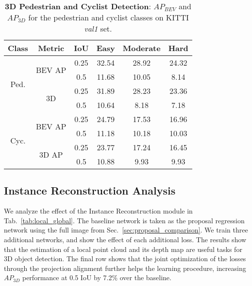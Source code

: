 \documentclass[10pt,twocolumn,letterpaper]{article}
\begin{document}
	\begin{table}[t!]
		\small
		\centering
		\begin{tabular}{|c|c|c||ccc|}
			\hline
			Class & Metric & IoU & Easy & Moderate & Hard\\
			\hline
			\multirow{4}{*}{Ped.} & \multirow{2}{*}{BEV AP} & 0.25 & 32.54 & 28.92 & 24.32 \\
			& & 0.5   & 11.68 & 10.05 & 8.14 \\ \cline{2-6}
			& \multirow{2}{*}{3D}     & 0.25 & 31.89 & 28.23 & 23.36 \\ 
			& & 0.5   & 10.64 & 8.18 & 7.18 \\ \hline
			\multirow{4}{*}{Cyc.} & \multirow{2}{*}{BEV AP} & 0.25 & 24.79 & 17.53 & 16.96 \\
			& & 0.5   & 11.18 & 10.18 & 10.03 \\ \cline{2-6}
			& \multirow{2}{*}{3D AP}  & 0.25 & 23.77 & 17.24 & 16.45 \\
			& & 0.5   & 10.88 & 9.93 & 9.93 \\ \hline 
			
		\end{tabular}
		\caption{\textbf{3D Pedestrian and Cyclist Detection}: \emph{$AP_{BEV}$} and \emph{$AP_{3D}$} for the pedestrian and cyclist classes on KITTI \emph{val1} set.}
		\label{tab:kitti_val_ped_cyc}
	\end{table}
	
	\subsection{Instance Reconstruction Analysis} \label{sec:instance_reconstruction_analysis}
	We analyze the effect of the Instance Reconstruction module in Tab.~\ref{tab:local_global}. The baseline network is taken as the proposal regression network using the full image from Sec.~\ref{sec:proposal_comparison}. We train three additional networks, and show the effect of each additional loss. The results show that the estimation of a local point cloud and its depth map are useful tasks for 3D object detection. The final row shows that the joint optimization of the losses through the projection alignment further helps the learning procedure, increasing $AP_{3D}$ performance at 0.5 IoU by 7.2\% over the baseline.
	
\end{document}
